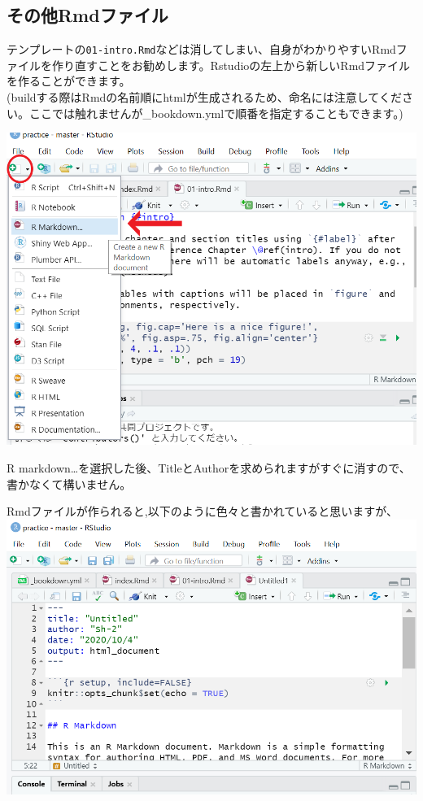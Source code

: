 \documentclass[
]{book}
\begin{document}
\hypertarget{ux305dux306eux4ed6rmdux30d5ux30a1ux30a4ux30eb}{%
\subsection{その他Rmdファイル}\label{ux305dux306eux4ed6rmdux30d5ux30a1ux30a4ux30eb}}

テンプレートの\texttt{01-intro.Rmd}などは消してしまい、自身がわかりやすいRmdファイルを作り直すことをお勧めします。Rstudioの左上から新しいRmdファイルを作ることができます。\\
(buildする際はRmdの名前順にhtmlが生成されるため、命名には注意してください。ここでは触れませんが\_bookdown.ymlで順番を指定することもできます。)

\includegraphics{pics/newRmd.png}

R markdown\ldots を選択した後、TitleとAuthorを求められますがすぐに消すので、書かなくて構いません。

Rmdファイルが作られると,以下のように色々と書かれていると思いますが、
\includegraphics{pics/clearRmd.png}
\end{document}
